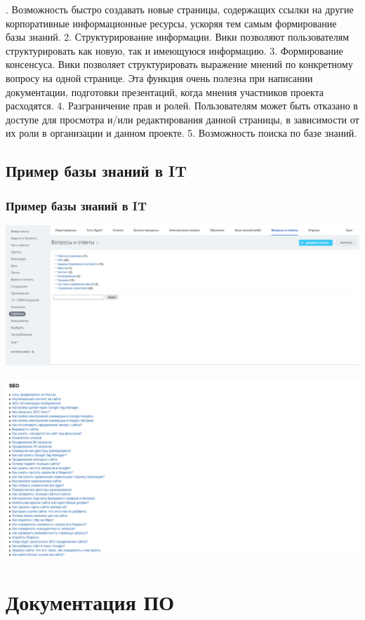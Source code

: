 \documentclass{industrial-development}
\begin{document}
. Возможность быстро создавать новые страницы, содержащих ссылки на другие корпоративные информационные ресурсы, ускоряя тем самым формирование базы знаний.
2. Структурирование информации. Вики позволяют пользователям структурировать как новую, так и имеющуюся информацию.
3. Формирование консенсуса. Вики позволяет структурировать выражение мнений по конкретному вопросу на одной странице. Эта функция очень полезна при написании документации, подготовки презентаций, когда мнения участников проекта расходятся.
4. Разграничение прав и ролей. Пользователям может быть отказано в доступе для просмотра и/или редактирования данной страницы, в зависимости от их роли в организации и данном проекте.
5. Возможность поиска по базе знаний.

\subsection{Пример базы знаний в IT}
\begin{frame} \frametitle{Пример базы знаний в IT}
\centerline{\includegraphics[width=1\textwidth]{voprosy-otvety.pdf}}
\centerline{\includegraphics[width=1\textwidth]{seo.pdf}}
\end{frame}

\section{Документация ПО}
\end{document}
